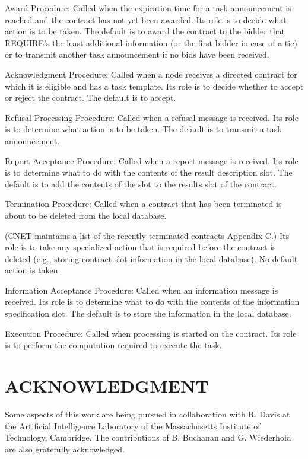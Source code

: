 \documentclass[
]{article}
\begin{document}
Award Procedure: Called when the expiration time for a task announcement
is reached and the contract has not yet been awarded. Its role is to
decide what action is to be taken. The default is to award the contract
to the bidder that REQUIRE's the least additional information (or the
first bidder in case of a tie) or to transmit another task announcement
if no bids have been received.

Acknowledgment Procedure: Called when a node receives a directed
contract for which it is eligible and has a task template. Its role is
to decide whether to accept or reject the contract. The default is to
accept.

Refusal Processing Procedure: Called when a refusal message is received.
Its role is to determine what action is to be taken. The default is to
transmit a task announcement.

Report Acceptance Procedure: Called when a report message is received.
Its role is to determine what to do with the contents of the result
description slot. The default is to add the contents of the slot to the
results slot of the contract.

Termination Procedure: Called when a contract that has been terminated
is about to be deleted from the local database.

(CNET maintains a list of the recently terminated contracts
\hyperref[appendix-c]{Appendix C}.) Its role is to take any specialized
action that is required before the contract is deleted (e.g., storing
contract slot information in the local database). No default action is
taken.

Information Acceptance Procedure: Called when an information message is
received. Its role is to determine what to do with the contents of the
information specification slot. The default is to store the information
in the local database.

Execution Procedure: Called when processing is started on the contract.
Its role is to perform the computation required to execute the task.

\section{ACKNOWLEDGMENT}\label{acknowledgment}

Some aspects of this work are being pursued in collaboration with R.
Davis at the Artificial Intelligence Laboratory of the Massachusetts
Institute of Technology, Cambridge. The contributions of B. Buchanan and
G. Wiederhold are also gratefully acknowledged.
\end{document}
